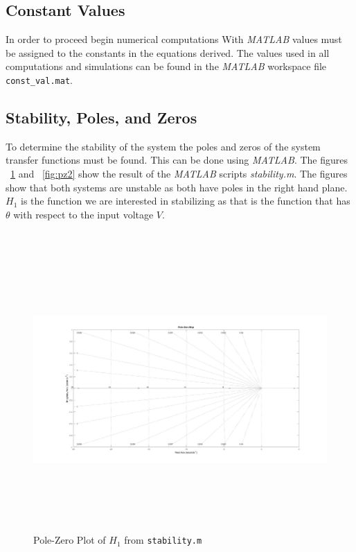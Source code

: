 \documentclass[12pt]{article} %
\begin{document}
\subsection{Constant Values}
In order to proceed begin numerical computations With \textit{MATLAB} values must be assigned to the constants in the equations derived. The values used in all computations and simulations can be found in the
\textit{MATLAB} workspace file \texttt{const\_val.mat}.

\subsection{Stability, Poles, and Zeros} \label{sec:stability}
To determine the stability of the system the poles and zeros of the system transfer functions must be found. This can be done using \textit{MATLAB}. The figures ~\ref{fig:pz1} and ~\ref{fig:pz2} show the result of the \textit{MATLAB} scripts \textit{stability.m}. The figures show that both systems are unstable as both have poles in the right hand plane. $H_1$ is the function we are interested in stabilizing as that is the function that has $\theta$ with respect to the input voltage $V$.
\\
\\
\\
\begin{figure}[h] 
\caption{Pole-Zero Plot of $H_1$ from \texttt{stability.m}}
\includegraphics[height=10cm, width = 17cm]{h1fig.jpg}
\label{fig:pz1}
\centering
\end{figure}
\end{document}

